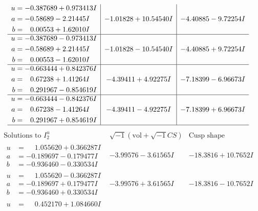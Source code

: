 \documentclass[1p]{elsarticle_modified}
\theoremstyle{definition}
\newcommand{\I}{\sqrt{-1}}
\begin{document}
$$\begin{array}{c|c|c}
\begin{aligned}
u &= -0.387689 + 0.973413 I \\
a &= -0.58689 - 2.21445 I \\
b &= \phantom{-}0.00553 + 1.62010 I\end{aligned}
 & -1.01828 + 10.54540 I & -4.40885 - 9.72254 I \\ \hline\begin{aligned}
u &= -0.387689 - 0.973413 I \\
a &= -0.58689 + 2.21445 I \\
b &= \phantom{-}0.00553 - 1.62010 I\end{aligned}
 & -1.01828 - 10.54540 I & -4.40885 + 9.72254 I \\ \hline\begin{aligned}
u &= -0.663444 + 0.842376 I \\
a &= \phantom{-}0.67238 + 1.41264 I \\
b &= \phantom{-}0.291967 - 0.854619 I\end{aligned}
 & -4.39411 + 4.92275 I & -7.18399 - 6.96673 I \\ \hline\begin{aligned}
u &= -0.663444 - 0.842376 I \\
a &= \phantom{-}0.67238 - 1.41264 I \\
b &= \phantom{-}0.291967 + 0.854619 I\end{aligned}
 & -4.39411 - 4.92275 I & -7.18399 + 6.96673 I\\
 \hline 
 \end{array}$$\newpage$$\begin{array}{c|c|c}  
\text{Solutions to }I^u_{2}& \I (\text{vol} + \sqrt{-1}CS) & \text{Cusp shape}\\
 \hline 
\begin{aligned}
u &= \phantom{-}1.055620 + 0.366287 I \\
a &= -0.189697 - 0.179477 I \\
b &= -0.936460 - 0.330534 I\end{aligned}
 & -3.99576 - 3.61565 I & -18.3816 + 10.7652 I \\ \hline\begin{aligned}
u &= \phantom{-}1.055620 - 0.366287 I \\
a &= -0.189697 + 0.179477 I \\
b &= -0.936460 + 0.330534 I\end{aligned}
 & -3.99576 + 3.61565 I & -18.3816 - 10.7652 I \\ \hline\begin{aligned}
u &= \phantom{-}0.452170 + 1.084660 I \\

\end{aligned}
\end{array}$$
\end{document}

